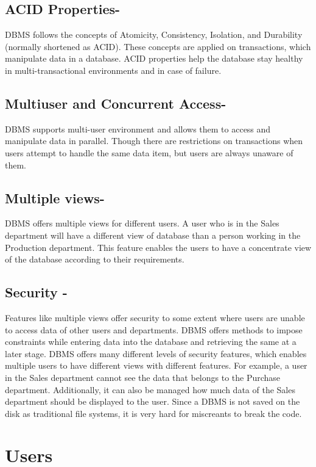 \documentclass[11pt]{article}
\begin{document}
\subsection*{ACID Properties-}DBMS follows the concepts of Atomicity, Consistency, Isolation, and Durability (normally shortened as ACID). These concepts are applied on transactions, which manipulate data in a database. ACID properties help the database stay healthy in multi-transactional environments and in case of failure.\\
\subsection*{Multiuser and Concurrent Access-}DBMS supports multi-user environment and allows them to access and manipulate data in parallel. Though there are restrictions on transactions when users attempt to handle the same data item, but users are always unaware of them.\\

\subsection*{Multiple views-}DBMS offers multiple views for different users. A user who is in the Sales department will have a different view of database than a person working in the Production department. This feature enables the users to have a concentrate view of the database according to their requirements.\\

\subsection*{Security -}Features like multiple views offer security to some extent where users are unable to access data of other users and departments. DBMS offers methods to impose constraints while entering data into the database and retrieving the same at a later stage. DBMS offers many different levels of security features, which enables multiple users to have different views with different features. For example, a user in the Sales department cannot see the data that belongs to the Purchase department. Additionally, it can also be managed how much data of the Sales department should be displayed to the user. Since a DBMS is not saved on the disk as traditional file systems, it is very hard for miscreants to break the code.\\

\section*{Users}
\end{document}
